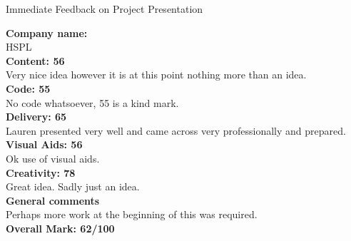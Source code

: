 \documentclass{article}
\begin{document}
\begin{center}
\Huge{Immediate Feedback on Project Presentation}\\
\end{center}


\normalsize
\textbf{Company name:}\\

HSPL\\

\textbf{Content: 56}\\

Very nice idea however it is at this point nothing more than an idea.\\

\textbf{Code: 55}\\

No code whatsoever, 55 is a kind mark.\\

\textbf{Delivery: 65}\\

Lauren presented very well and came across very professionally and prepared.\\

\textbf{Visual Aids: 56}\\

Ok use of visual aids.\\

\textbf{Creativity: 78}\\

Great idea. Sadly just an idea.\\

\textbf{General comments}\\

Perhaps more work at the beginning of this was required.\\

\textbf{Overall Mark: 62/100}
\end{document}
